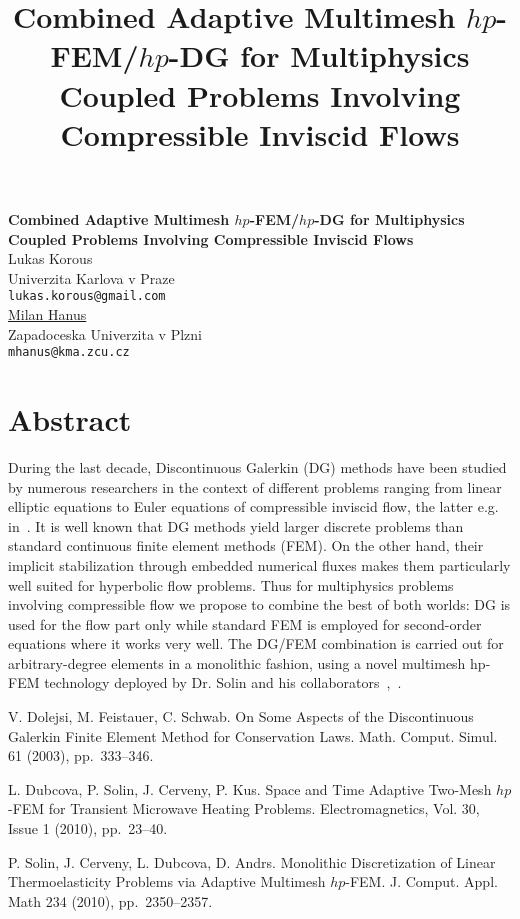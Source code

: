 \title{Combined Adaptive Multimesh $hp$-FEM/$hp$-DG for Multiphysics Coupled Problems Involving Compressible Inviscid Flows}
\author{} \institute{}

\begin{center}

\textbf{\Large Combined Adaptive Multimesh $hp$-FEM/$hp$-DG for Multiphysics Coupled Problems Involving Compressible Inviscid Flows}\\
\vspace{10mm}
{\large Lukas Korous}\\
Univerzita Karlova v Praze\\
{\tt lukas.korous@gmail.com}\\
\vspace{4mm}
{\large \underline{Milan Hanus}}\\
Zapadoceska Univerzita v Plzni\\
{\tt mhanus@kma.zcu.cz}

\end{center}

\section*{Abstract}

During the last decade, Discontinuous Galerkin (DG) methods have been studied by numerous researchers in the context of different problems ranging from linear elliptic equations to Euler equations of compressible inviscid flow, the latter e.g. in~\cite{1}. It is well known that DG methods yield larger discrete problems than standard continuous finite element methods (FEM). On the other hand, their implicit stabilization through embedded numerical fluxes makes them particularly well
suited for hyperbolic flow problems. Thus for multiphysics problems involving compressible flow we propose to combine the best of both worlds: DG is used for the flow part only while standard FEM is employed for second-order equations where it works very well. The DG/FEM combination is carried out for arbitrary-degree elements in a monolithic fashion, using a novel multimesh hp-FEM technology deployed by Dr. Solin and his collaborators~\cite{2},~\cite{3}.


\begin{thebibliography}{10}

{\sc V. Dolejsi, M. Feistauer, C. Schwab}. {On Some Aspects of the Discontinuous Galerkin Finite Element Method for Conservation Laws}. Math. Comput. Simul. 61 (2003), pp.~333--346.

{\sc L. Dubcova, P. Solin, J. Cerveny, P. Kus}. {Space and Time Adaptive Two-Mesh $hp$-FEM for Transient Microwave Heating Problems}. Electromagnetics, Vol. 30, Issue 1 (2010), pp.~23--40.

{\sc P. Solin, J. Cerveny, L. Dubcova, D. Andrs}. {Monolithic Discretization of Linear Thermoelasticity Problems via Adaptive Multimesh $hp$-FEM}. J. Comput. Appl. Math 234 (2010), pp.~2350--2357.

\end{thebibliography}